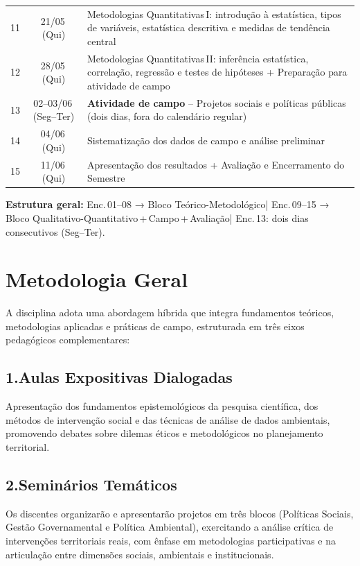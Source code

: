 \documentclass[11pt,a4paper]{article}
\begin{document}
\begin{small}
\begin{tabularx}{\textwidth}{@{}c c X@{}}
11 & 21/05\,(Qui) & Metodologias Quantitativas\,I: introdução à estatística, tipos de variáveis, estatística descritiva e medidas de tendência central \\
12 & 28/05\,(Qui) & Metodologias Quantitativas\,II: inferência estatística, correlação, regressão e testes de hipóteses + Preparação para atividade de campo \\
\rowcolor{uefslight}
13 & 02--03/06\,(Seg--Ter) & \textbf{Atividade de campo} -- Projetos sociais e políticas públicas (dois dias, fora do calendário regular) \\
14 & 04/06\,(Qui) & Sistematização dos dados de campo e análise preliminar \\
15 & 11/06\,(Qui) & Apresentação dos resultados + Avaliação e Encerramento do Semestre \\
\bottomrule
\end{tabularx}
\end{small}

\begin{tcolorbox}[uefsbox]
\textbf{Estrutura geral:}\enspace
Enc.\,01--08 → Bloco Teórico-Metodológico\enspace|\enspace
Enc.\,09--15 → Bloco Qualitativo-Quantitativo\,+\,Campo\,+\,Avaliação\enspace|\enspace
Enc.\,13: dois dias consecutivos (Seg--Ter).
\end{tcolorbox}

\section*{Metodologia Geral}

A disciplina adota uma abordagem híbrida que integra fundamentos teóricos, metodologias aplicadas e práticas de campo, estruturada em três eixos pedagógicos complementares:

\subsection*{1.\enspace Aulas Expositivas Dialogadas}
Apresentação dos fundamentos epistemológicos da pesquisa científica, dos métodos de intervenção social e das técnicas de análise de dados ambientais, promovendo debates sobre dilemas éticos e metodológicos no planejamento territorial.

\subsection*{2.\enspace Seminários Temáticos}
Os discentes organizarão e apresentarão projetos em três blocos (Políticas Sociais, Gestão Governamental e Política Ambiental), exercitando a análise crítica de intervenções territoriais reais, com ênfase em metodologias participativas e na articulação entre dimensões sociais, ambientais e institucionais.
\end{document}
